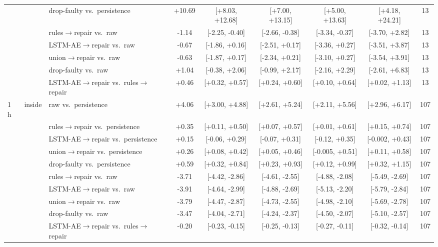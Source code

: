 \begin{longtable}{lllcccccc}
 &  & drop-faulty vs.\ persistence & +10.69 & [+8.03, +12.68] & [+7.00, +13.15] & [+5.00, +13.63] & [+4.18, +24.21] & 13 \\
 &  & rules$\rightarrow$repair vs.\ raw & -1.14 & [-2.25, -0.40] & [-2.66, -0.38] & [-3.34, -0.37] & [-3.70, +2.82] & 13 \\
 &  & LSTM-AE$\rightarrow$repair vs.\ raw & -0.67 & [-1.86, +0.16] & [-2.51, +0.17] & [-3.36, +0.27] & [-3.51, +3.87] & 13 \\
 &  & union$\rightarrow$repair vs.\ raw & -0.63 & [-1.87, +0.17] & [-2.34, +0.21] & [-3.10, +0.27] & [-3.54, +3.91] & 13 \\
 &  & drop-faulty vs.\ raw & +1.04 & [-0.38, +2.06] & [-0.99, +2.17] & [-2.16, +2.29] & [-2.61, +6.83] & 13 \\
 &  & LSTM-AE$\rightarrow$repair vs.\ rules$\rightarrow$repair & +0.46 & [+0.32, +0.57] & [+0.24, +0.60] & [+0.10, +0.64] & [+0.02, +1.13] & 13 \\
\midrule
1 h & inside & raw vs.\ persistence & +4.06 & [+3.00, +4.88] & [+2.61, +5.24] & [+2.11, +5.56] & [+2.96, +6.17] & 107 \\
 &  & rules$\rightarrow$repair vs.\ persistence & +0.35 & [+0.11, +0.50] & [+0.07, +0.57] & [+0.01, +0.61] & [+0.15, +0.74] & 107 \\
 &  & LSTM-AE$\rightarrow$repair vs.\ persistence & +0.15 & [-0.06, +0.29] & [-0.07, +0.31] & [-0.12, +0.35] & [-0.002, +0.43] & 107 \\
 &  & union$\rightarrow$repair vs.\ persistence & +0.26 & [+0.08, +0.42] & [+0.05, +0.46] & [-0.005, +0.51] & [+0.11, +0.58] & 107 \\
 &  & drop-faulty vs.\ persistence & +0.59 & [+0.32, +0.84] & [+0.23, +0.93] & [+0.12, +0.99] & [+0.32, +1.15] & 107 \\
 &  & rules$\rightarrow$repair vs.\ raw & -3.71 & [-4.42, -2.86] & [-4.61, -2.55] & [-4.88, -2.08] & [-5.49, -2.69] & 107 \\
 &  & LSTM-AE$\rightarrow$repair vs.\ raw & -3.91 & [-4.64, -2.99] & [-4.88, -2.69] & [-5.13, -2.20] & [-5.79, -2.84] & 107 \\
 &  & union$\rightarrow$repair vs.\ raw & -3.79 & [-4.47, -2.87] & [-4.73, -2.55] & [-4.98, -2.10] & [-5.69, -2.78] & 107 \\
 &  & drop-faulty vs.\ raw & -3.47 & [-4.04, -2.71] & [-4.24, -2.37] & [-4.50, -2.07] & [-5.10, -2.57] & 107 \\
 &  & LSTM-AE$\rightarrow$repair vs.\ rules$\rightarrow$repair & -0.20 & [-0.23, -0.15] & [-0.25, -0.13] & [-0.27, -0.11] & [-0.32, -0.14] & 107 \\

\end{longtable}
